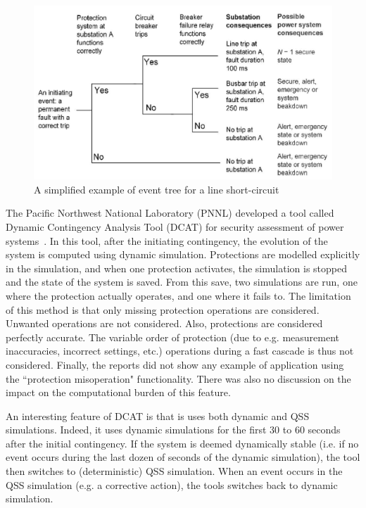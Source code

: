 \begin{figure}
    \centering
    \includegraphics[width=0.8\linewidth]{Figs/EventTree.png}
    \caption{A simplified example of event tree for a line short-circuit~\cite{GridPSA}}
    \label{fig:eventTree}
\end{figure}

The Pacific Northwest National Laboratory (PNNL) developed a tool called Dynamic Contingency Analysis Tool (DCAT) for security assessment of power systems~\cite{DCATphase1, DCATphase2}. In this tool, after the initiating contingency, the evolution of the system is computed using dynamic simulation. Protections are modelled explicitly in the simulation, and when one protection activates, the simulation is stopped and the state of the system is saved. From this save, two simulations are run, one where the protection actually operates, and one where it fails to. The limitation of this method is that only missing protection operations are considered. Unwanted operations are not considered. Also, protections are considered perfectly accurate. The variable order of protection (due to e.g. measurement inaccuracies, incorrect settings, etc.) operations during a fast cascade is thus not considered. Finally, the reports did not show any example of application using the ``protection misoperation" functionality. There was also no discussion on the impact on the computational burden of this feature.

An interesting feature of DCAT is that is uses both dynamic and QSS simulations. Indeed, it uses dynamic simulations for the first 30 to 60 seconds after the initial contingency. If the system is deemed dynamically stable (i.e. if no event occurs during the last dozen of seconds of the dynamic simulation), the tool then switches to (deterministic) QSS simulation. When an event occurs in the QSS simulation (e.g. a corrective action), the tools switches back to dynamic simulation.

